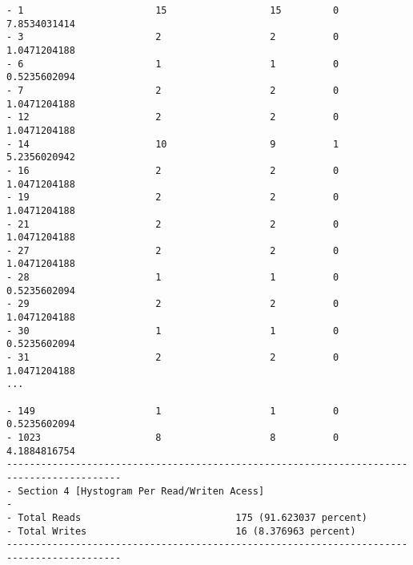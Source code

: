 \begin{verbatim}
- 1                       15                  15         0             7.8534031414                
- 3                       2                   2          0             1.0471204188                
- 6                       1                   1          0             0.5235602094                
- 7                       2                   2          0             1.0471204188                
- 12                      2                   2          0             1.0471204188                
- 14                      10                  9          1             5.2356020942                
- 16                      2                   2          0             1.0471204188                
- 19                      2                   2          0             1.0471204188                
- 21                      2                   2          0             1.0471204188                
- 27                      2                   2          0             1.0471204188                
- 28                      1                   1          0             0.5235602094                
- 29                      2                   2          0             1.0471204188                
- 30                      1                   1          0             0.5235602094                
- 31                      2                   2          0             1.0471204188                
...
             
- 149                     1                   1          0             0.5235602094                
- 1023                    8                   8          0             4.1884816754                
------------------------------------------------------------------------------------------
- Section 4 [Hystogram Per Read/Writen Acess]                                             
-                                                                                         
- Total Reads                           175 (91.623037 percent)                                        
- Total Writes                          16 (8.376963 percent)   
------------------------------------------------------------------------------------------                                      
\end{verbatim}

